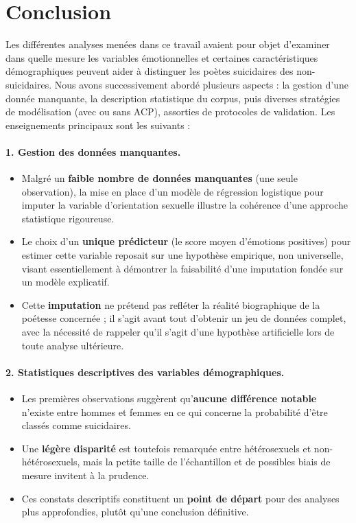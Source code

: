 \section{Conclusion}
\label{sec:conclusion-globale}

Les différentes analyses menées dans ce travail avaient pour objet d’examiner dans quelle mesure les variables émotionnelles et certaines caractéristiques démographiques peuvent aider à distinguer les poètes suicidaires des non-suicidaires. Nous avons successivement abordé plusieurs aspects : la gestion d’une donnée manquante, la description statistique du corpus, puis diverses stratégies de modélisation (avec ou sans ACP), assorties de protocoles de validation. Les enseignements principaux sont les suivants :

\paragraph{1. Gestion des données manquantes.}
\begin{itemize}
	\item Malgré un \textbf{faible nombre de données manquantes} (une seule observation), la mise en place d’un modèle de régression logistique pour imputer la variable d’orientation sexuelle illustre la cohérence d’une approche statistique rigoureuse.  
	\item Le choix d’un \textbf{unique prédicteur} (le score moyen d’émotions positives) pour estimer cette variable reposait sur une hypothèse empirique, non universelle, visant essentiellement à démontrer la faisabilité d’une imputation fondée sur un modèle explicatif.  
	\item Cette \textbf{imputation} ne prétend pas refléter la réalité biographique de la poétesse concernée ; il s’agit avant tout d’obtenir un jeu de données complet, avec la nécessité de rappeler qu’il s’agit d’une hypothèse artificielle lors de toute analyse ultérieure.
\end{itemize}

\paragraph{2. Statistiques descriptives des variables démographiques.}
\begin{itemize}
	\item Les premières observations suggèrent qu’\textbf{aucune différence notable} n’existe entre hommes et femmes en ce qui concerne la probabilité d’être classés comme suicidaires.  
	\item Une \textbf{légère disparité} est toutefois remarquée entre hétérosexuels et non-hétérosexuels, mais la petite taille de l’échantillon et de possibles biais de mesure invitent à la prudence.  
	\item Ces constats descriptifs constituent un \textbf{point de départ} pour des analyses plus approfondies, plutôt qu’une conclusion définitive.
\end{itemize}

